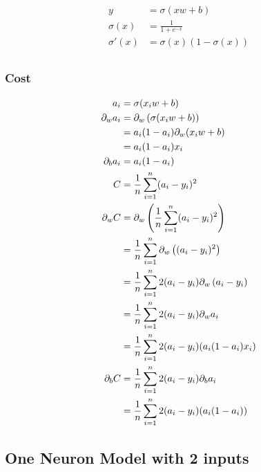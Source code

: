 \documentclass{article}
\begin{document}
\begin{align}
	y &= \sigma(xw + b) \\
	\sigma(x) &= \frac{1}{1 + e^{-x}} \\
	\sigma'(x) &= \sigma(x)(1 - \sigma(x)) \\
\end{align}

\subsubsection{Cost}

\def\pd[#1]{\partial_{#1}}

\begin{align}
	a_i &= \sigma(x_iw + b) \\
	\pd[w]a_i 
		&= \pd[w]\left(\sigma(x_iw + b)\right) \\
		&= a_i(1 - a_i)\pd[w](x_iw + b) \\
		&= a_i(1 - a_i)x_i \\
	\pd[b]a_i 
		&= a_i(1 - a_i) \\
	C &= \avgsum[i,n](a_i - y_i)^2 \\
	\pd[w]C 
		&= \pd[w]\left(\avgsum[i,n](a_i - y_i)^2\right) \\
		&= \avgsum[i,n]\pd[w]\left((a_i - y_i)^2\right) \\
		&= \avgsum[i,n]2(a_i - y_i)\pd[w]\left(a_i - y_i\right) \\
		&= \avgsum[i,n]2(a_i - y_i)\pd[w]a_i \\
		&= \avgsum[i,n]2(a_i - y_i)(a_i(1 - a_i)x_i) \\
	\pd[b]C 
		&= \avgsum[i,n]2(a_i - y_i)\pd[b]a_i \\
		&= \avgsum[i,n]2(a_i - y_i)(a_i(1 - a_i)) \\
\end{align}

\subsection{One Neuron Model with 2 inputs}

\def\2d{2}

\begin{center}
\end{center}
\end{document}
